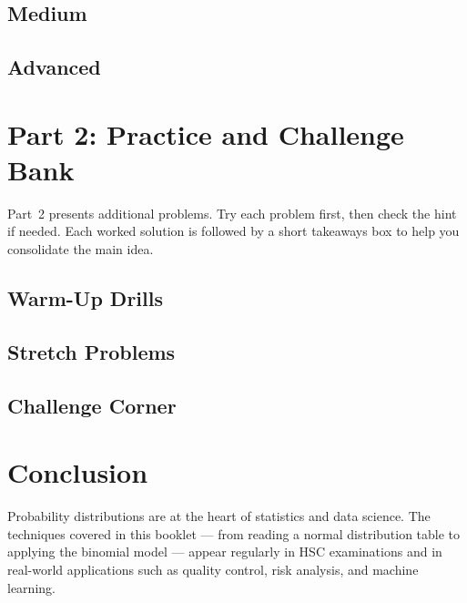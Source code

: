 \documentclass[12pt]{article}
\begin{document}
\subsection{Medium}


\subsection{Advanced}


\section{Part 2: Practice and Challenge Bank}

Part~2 presents additional problems. Try each problem first, then check the hint if needed. Each worked solution is followed by a short takeaways box to help you consolidate the main idea.

\subsection{Warm-Up Drills}


\subsection{Stretch Problems}


\subsection{Challenge Corner}


\section{Conclusion}

Probability distributions are at the heart of statistics and data science. The techniques covered in this booklet --- from reading a normal distribution table to applying the binomial model --- appear regularly in HSC examinations and in real-world applications such as quality control, risk analysis, and machine learning.
\end{document}

